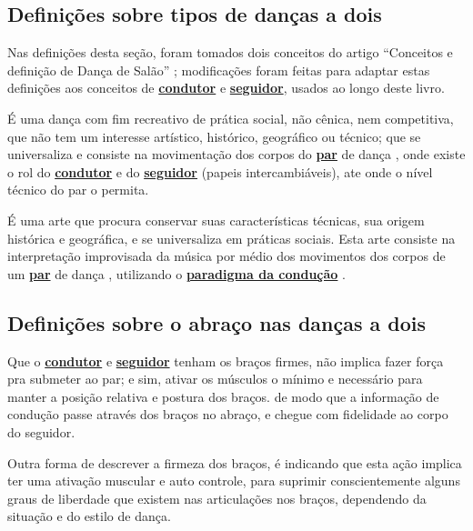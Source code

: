 \subsection{Definições sobre tipos de danças a dois}

Nas definições desta seção, foram tomados dois conceitos do artigo 
``Conceitos e definição de Dança de Salão'' \cite{Zamoner2012};
modificações foram feitas para adaptar estas definições aos conceitos de 
\hyperref[def:Condutor]{\textbf{condutor}} e \hyperref[def:Seguidor]{\textbf{seguidor}}, 
usados ao longo deste livro.

\begin{definition}
\label{def:DancaSocial} 
É uma dança com fim recreativo de prática social, não cênica, nem competitiva, 
que não tem um interesse artístico, histórico, geográfico ou técnico; 
que se universaliza e consiste na movimentação dos corpos do \hyperref[def:Par]{\textbf{par}} de dança  \cite{Zamoner2012}, 
onde existe o rol do \hyperref[def:Condutor]{\textbf{condutor}} 
e do \hyperref[def:Seguidor]{\textbf{seguidor}} (papeis intercambiáveis), 
ate onde o nível técnico do par o permita.
\end{definition}

\begin{definition}
\label{def:DancaSalao}  
É uma arte que procura conservar suas características técnicas, 
sua origem histórica e geográfica, e se universaliza em práticas sociais. 
Esta arte consiste na interpretação improvisada da música por médio dos movimentos 
dos corpos de um \hyperref[def:Par]{\textbf{par}} de dança \cite{Zamoner2012}, 
utilizando o \hyperref[def:ParadigmaConducao]{\textbf{paradigma da condução}} .
\end{definition}

\subsection{Definições sobre o abraço nas danças a dois}

\begin{definition}
\label{def:brazosfirmes} 
Que o \hyperref[def:Condutor]{\textbf{condutor}} e \hyperref[def:Seguidor]{\textbf{seguidor}}
tenham os braços firmes, não implica fazer força pra submeter ao par;
e sim, ativar os músculos o mínimo e necessário para manter a posição relativa e postura dos braços.
de modo que a informação de condução passe através dos braços no abraço, 
e chegue com fidelidade ao corpo do seguidor.

Outra forma de descrever a firmeza dos braços, 
é indicando que esta ação implica ter uma ativação muscular e auto controle, 
para suprimir conscientemente alguns graus de liberdade que existem nas articulações nos braços, 
dependendo da situação e do estilo de dança.
\end{definition}




